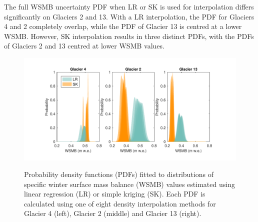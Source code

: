 \documentclass[twocolumn,letterpaper]{igs}
\begin{document}
The full WSMB uncertainty PDF when LR or SK is used for interpolation differs significantly on Glaciers 2 and 13. With a LR interpolation, the PDF for Glaciers 4 and 2 completely overlap, while the PDF of Glacier 13 is centred at a lower WSMB. However, SK interpolation results in three distinct PDFs, with the PDFs of Glaciers 2 and 13 centred at lower WSMB values. 

\begin{figure}
	\centering
	\includegraphics[width =\textwidth]{WSMBDist_LRvsSK.pdf}\\
	\caption{Probability density functions (PDFs) fitted to distributions of specific winter surface mass balance (WSMB) values estimated using linear regression (LR) or simple kriging (SK). Each PDF is calculated using one of eight density interpolation methods for Glacier 4 (left), Glacier 2 (middle) and Glacier 13 (right).}
	\label{fig:WSMBDist_LRvsSK}
\end{figure}
\end{document}
